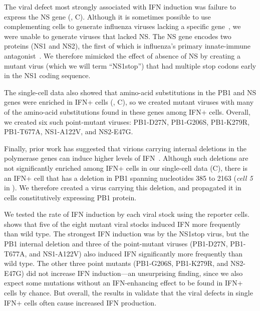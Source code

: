 \documentclass[9pt,lineno]{elife}
\begin{document}
The viral defect most strongly associated with IFN induction was failure to express the NS gene (, C).
Although it is sometimes possible to use complementing cells to generate influenza viruses lacking a specific gene~\citep{fujii2003selective,marsh2007specific}, we were unable to generate viruses that lacked NS.
The NS gene encodes two proteins (NS1 and NS2), the first of which is influenza's primary innate-immune antagonist~\citep{garcia1998influenza, hale2008multifunctional}.
We therefore mimicked the effect of absence of NS by creating a mutant virus (which we will term ``NS1stop'') that had multiple stop codons early in the NS1 coding sequence.

The single-cell data also showed that amino-acid substitutions in the PB1 and NS genes were enriched in IFN+ cells (, C), so we created mutant viruses with many of the amino-acid substitutions found in these genes among IFN+ cells.
Overall, we created six such point-mutant viruses: PB1-D27N, PB1-G206S, PB1-K279R, PB1-T677A, NS1-A122V, and NS2-E47G.

Finally, prior work has suggested that virions carrying internal deletions in the polymerase genes can induce higher levels of IFN~\citep{baum2010preference, tapia2013defective, boergeling2015evidence, dimmock2015cloned}.
Although such deletions are not significantly enriched among IFN+ cells in our single-cell data (C), there is an IFN+ cell that has a deletion in PB1 spanning nucleotides 385 to 2163 (\textit{cell 5} in ).
We therefore created a virus carrying this deletion, and propagated it in cells constitutively expressing PB1 protein.

We tested the rate of IFN induction by each viral stock using the reporter cells.
 shows that five of the eight mutant viral stocks induced IFN more frequently than wild type.
The strongest IFN induction was by the NS1stop virus, but the PB1 internal deletion and three of the point-mutant viruses (PB1-D27N, PB1-T677A, and NS1-A122V) also induced IFN significantly more frequently than wild type.
The other three point mutants (PB1-G206S, PB1-K279R, and NS2-E47G) did not increase IFN induction---an unsurprising finding, since we also expect some mutations without an IFN-enhancing effect to be found in IFN+ cells by chance.
But overall, the results in  validate that the viral defects in single IFN+ cells often cause increased IFN production.
\end{document}
